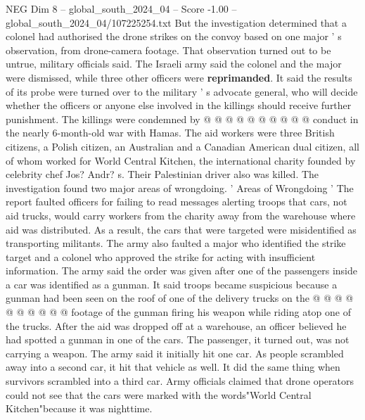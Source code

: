 \begin{textsample}{NEG Dim 8 – global\_south\_2024\_04 – Score -1.00 – global\_south\_2024\_04/107225254.txt}
But the investigation determined that a colonel had authorised the drone strikes on the convoy based on one major ' s observation, from drone-camera footage.
That observation turned out to be untrue, military officials said.
The Israeli army said the colonel and the major were dismissed, while three other officers were \textbf{reprimanded}.
It said the results of its probe were turned over to the military ' s advocate general, who will decide whether the officers or anyone else involved in the killings should receive further punishment.
The killings were condemned by @ @ @ @ @ @ @ @ @ @ conduct in the nearly 6-month-old war with Hamas.
The aid workers were three British citizens, a Polish citizen, an Australian and a Canadian American dual citizen, all of whom worked for World Central Kitchen, the international charity founded by celebrity chef Jos?
Andr? s.
Their Palestinian driver also was killed.
The investigation found two major areas of wrongdoing. ' Areas of Wrongdoing ' The report faulted officers for failing to read messages alerting troops that cars, not aid trucks, would carry workers from the charity away from the warehouse where aid was distributed.
As a result, the cars that were targeted were misidentified as transporting militants.
The army also faulted a major who identified the strike target and a colonel who approved the strike for acting with insufficient information.
The army said the order was given after one of the passengers inside a car was identified as a gunman.
It said troops became suspicious because a gunman had been seen on the roof of one of the delivery trucks on the @ @ @ @ @ @ @ @ @ @ footage of the gunman firing his weapon while riding atop one of the trucks.
After the aid was dropped off at a warehouse, an officer believed he had spotted a gunman in one of the cars.
The passenger, it turned out, was not carrying a weapon.
The army said it initially hit one car.
As people scrambled away into a second car, it hit that vehicle as well.
It did the same thing when survivors scrambled into a third car.
Army officials claimed that drone operators could not see that the cars were marked with the words"World Central Kitchen"because it was nighttime.

\end{textsample}
